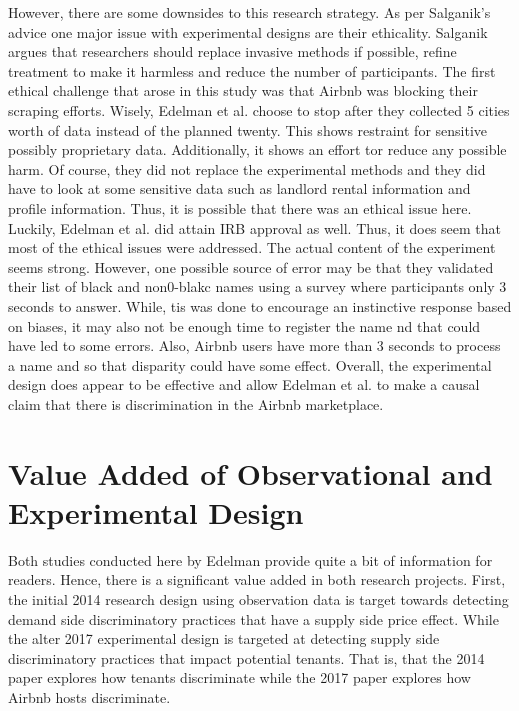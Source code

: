 \documentclass[dvips,12pt]{article}
\begin{document}
However, there are some downsides to this research strategy. As per Salganik’s advice one major issue with experimental designs are their ethicality. Salganik argues that researchers should replace invasive methods if possible, refine treatment to make it harmless and reduce the number of participants. The first ethical challenge that arose in this study was that Airbnb was blocking their scraping efforts. Wisely, Edelman et al. choose to stop after they collected 5 cities worth of data instead of the planned twenty. This shows restraint for sensitive possibly proprietary data. Additionally, it shows an effort tor reduce any possible harm. Of course, they did not replace the experimental methods and they did have to look at some sensitive data such as landlord rental information and profile information. Thus, it is possible that there was an ethical issue here. Luckily, Edelman et al. did attain IRB approval as well. Thus, it does seem that most of the ethical issues were addressed. The actual content of the experiment seems strong. However, one possible source of error may be that they validated their list of black and non0-blakc names using a survey where participants only 3 seconds to answer. While, tis was done to encourage an instinctive response based on biases, it may also not be enough time to register the name nd that could have led to some errors. Also, Airbnb users have more than 3 seconds to process a name and so that disparity could have some effect. Overall, the experimental design does appear to be effective and allow Edelman et al. to make a causal claim that there is discrimination in the Airbnb marketplace.
\section{Value Added of Observational and Experimental Design}
Both studies conducted here by Edelman provide quite a bit of information for readers. Hence, there is a significant value added in both research projects. First, the initial 2014 research design using observation data is target towards detecting demand side discriminatory practices that have a supply side price effect. While the alter 2017 experimental design is targeted at detecting supply side discriminatory practices that impact potential tenants. That is, that the 2014 paper explores how tenants discriminate while the 2017 paper explores how Airbnb hosts discriminate.  
\end{document}
